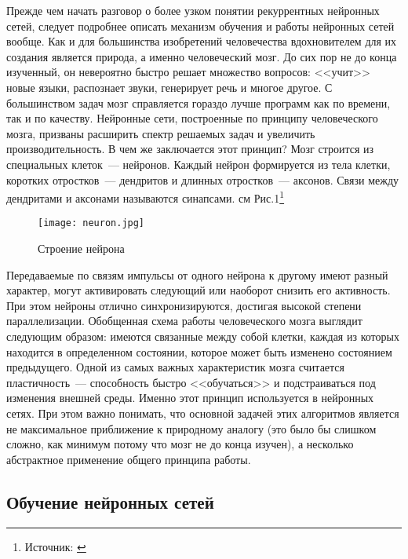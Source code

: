 \documentclass[12pt, a4paper]{article}
\begin{document}
Прежде чем начать разговор о более узком понятии рекуррентных нейронных сетей, следует подробнее описать механизм обучения и работы нейронных сетей вообще. Как и для большинства изобретений человечества вдохновителем для их создания является природа, а именно человеческий мозг. До сих пор не до конца изученный, он невероятно быстро решает множество вопросов: <<учит>> новые языки, распознает звуки, генерирует речь и многое другое. С большинством задач мозг справляется гораздо лучше программ как по времени, так и по качеству. Нейронные сети, построенные по принципу человеческого мозга, призваны расширить спектр решаемых задач и увеличить производительность. В чем же заключается этот принцип? Мозг строится из специальных клеток~--- нейронов. Каждый нейрон формируется из тела клетки, коротких отростков~--- дендритов и длинных отростков~--- аксонов. Связи между дендритами и аксонами называются синапсами. см Рис.1\footnote{Источник: \cite{neuron}}

\begin{wrapfigure}{r}{0.5\textwidth}
   \centering
   \texttt{[image: neuron.jpg]}
   \caption{Строение нейрона}
\end{wrapfigure}

Передаваемые по связям импульсы от одного нейрона к другому имеют разный характер, могут активировать следующий или наоборот снизить его активность. При этом нейроны отлично синхронизируются, достигая высокой степени параллелизации. Обобщенная схема работы человеческого мозга выглядит следующим образом: имеются связанные между собой клетки, каждая из которых находится в определенном состоянии, которое может быть изменено состоянием предыдущего. Одной из самых важных характеристик мозга считается пластичность~--- способность быстро <<обучаться>> и подстраиваться под изменения внешней среды. Именно этот принцип используется в нейронных сетях. При этом важно понимать, что основной задачей этих алгоритмов является не максимальное приближение к природному аналогу (это было бы слишком сложно, как минимум потому что мозг не до конца изучен), а несколько абстрактное применение общего принципа работы.

\subsection{Обучение нейронных сетей}
\end{document}
